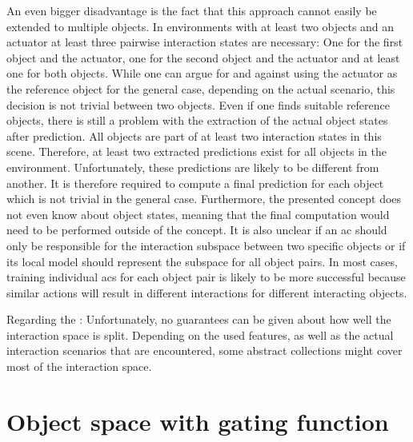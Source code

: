 An even bigger disadvantage is the fact that this approach cannot easily be extended to multiple objects. In environments with at least two objects and an actuator at least three pairwise interaction states are necessary: One for the first object and the actuator, one for the second object and the actuator and at least one for both objects. 
While one can argue for and against using the actuator as the reference object for the general case, depending on the actual scenario, this decision is not trivial between two objects. 
Even if one finds suitable reference objects, there is still a problem with the extraction of the actual object states after prediction. All objects are part of at least two interaction states in this scene. Therefore, at least two extracted predictions exist for all objects in the environment. Unfortunately, these predictions are likely to be different from another. It is therefore required to compute a final prediction for each object which is not trivial in the general case. Furthermore, the presented concept does not even know about object states, meaning that the final computation would need to be performed outside of the concept.
It is also unclear if an \gls{ac} should only be responsible for the interaction subspace between two specific objects or if its local model should represent the subspace for all object pairs. In most cases, training individual \glspl{ac} for each object pair is likely to be more successful because similar actions will result in different interactions for different interacting objects.

Regarding the : 
Unfortunately, no guarantees can be given about how well the interaction space is split. Depending on the used features, as well as the actual interaction scenarios that are encountered, some abstract collections might cover most of the interaction space. 


\section{Object space with gating function \label{sec:gate}}

